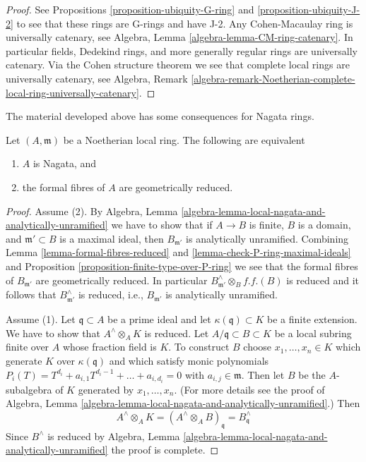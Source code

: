 \begin{proof}
See Propositions \ref{proposition-ubiquity-G-ring} and
\ref{proposition-ubiquity-J-2} to see that these rings are
G-rings and have J-2. Any Cohen-Macaulay ring is universally
catenary, see Algebra, Lemma \ref{algebra-lemma-CM-ring-catenary}.
In particular fields, Dedekind rings, and more generally
regular rings are universally catenary. Via the Cohen structure theorem 
we see that complete local rings are universally catenary, see
Algebra, Remark
\ref{algebra-remark-Noetherian-complete-local-ring-universally-catenary}.
\end{proof}

\noindent
The material developed above has some consequences for Nagata rings.

\begin{lemma}
\label{lemma-Nagata-local-ring}
Let $(A, \mathfrak m)$ be a Noetherian local ring.
The following are equivalent
\begin{enumerate}
\item $A$ is Nagata, and
\item the formal fibres of $A$ are geometrically reduced.
\end{enumerate}
\end{lemma}

\begin{proof}
Assume (2). By
Algebra, Lemma \ref{algebra-lemma-local-nagata-and-analytically-unramified}
we have to show that if $A \to B$ is finite, $B$ is a domain,
and $\mathfrak m' \subset B$ is a maximal ideal, then $B_{\mathfrak m'}$
is analytically unramified.
Combining Lemma \ref{lemma-formal-fibres-reduced} and
\ref{lemma-check-P-ring-maximal-ideals} and
Proposition \ref{proposition-finite-type-over-P-ring}
we see that the formal fibres of $B_{\mathfrak m'}$ are
geometrically reduced. In particular
$B_{\mathfrak m'}^\wedge \otimes_B f.f.(B)$ is reduced
and it follows that $B_{\mathfrak m'}^\wedge$ is reduced, i.e.,
$B_{\mathfrak m'}$ is analytically unramified.

\medskip\noindent
Assume (1). Let $\mathfrak q \subset A$ be a prime ideal
and let $\kappa(\mathfrak q) \subset K$ be a finite extension.
We have to show that $A^\wedge \otimes_A K$ is reduced.
Let $A/\mathfrak q \subset B \subset K$ be a local subring
finite over $A$ whose fraction field is $K$.
To construct $B$ choose $x_1, \ldots, x_n \in K$
which generate $K$ over $\kappa(\mathfrak q)$
and which satisfy monic polynomials
$P_i(T) = T^{d_i} + a_{i, 1} T^{d_i - 1} + \ldots + a_{i, d_i} = 0$
with $a_{i, j} \in \mathfrak m$. Then let $B$ be the $A$-subalgebra
of $K$ generated by $x_1, \ldots, x_n$. (For more details see
the proof of Algebra, Lemma
\ref{algebra-lemma-local-nagata-and-analytically-unramified}.)
Then
$$
A^\wedge \otimes_A K =
(A^\wedge \otimes_A B)_\mathfrak q =
B^\wedge_\mathfrak q
$$
Since $B^\wedge$ is reduced by  Algebra, Lemma
\ref{algebra-lemma-local-nagata-and-analytically-unramified}
the proof is complete.
\end{proof}

